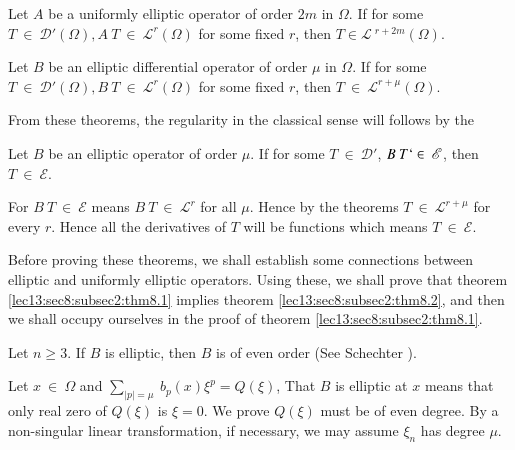 \begin{theorem} \label{lec13:sec8:subsec2:thm8.1}%
  Let $A$ be a uniformly elliptic operator of order $2m$ in $\Omega$. If
  for some $T ~ \in ~ \mathscr{D}' (\Omega), A ~ T ~
  \in~ \mathscr{L}^r(\Omega)$ for some fixed $r$, then $T
  \in \mathscr{L} ~ ^{r+2m}(\Omega)$. 
\end{theorem}

\begin{theorem}\label{lec13:sec8:subsec2:thm8.2}%
  Let $B$ be an elliptic differential operator of order $\mu$ in
  $\Omega$. If for some $T ~ \in ~ \mathscr{D}' (\Omega), B ~ T
  ~ \in ~\mathscr{L}^r (\Omega)$ for some fixed $r$, then $T ~
  \in   ~\mathscr{L}^{r+\mu} (\Omega)$. 
\end{theorem}

From these theorems, the regularity in the classical sense will follows by the 

\begin{coro*}
  Let $B$ be an elliptic operator of order $\mu$. If for some $T ~
  \in ~ \mathscr{D}'$, $B ~ T ` \in ~ \mathscr{E}$, then
  $T ~ \in ~ \mathscr{E}$. 
\end{coro*}

For $B ~ T ~ \in ~ \mathscr{E}$ means $B ~ T ~ \in ~
\mathscr{L}^r $ for all $\mu$. Hence by the theorems $T ~ \in
~ \mathscr{L}^{r+\mu}$ for every $r$. Hence all the derivatives of $T$
will be functions which means $T ~ \in ~ \mathscr{E}$. 

Before proving these theorems, we shall establish some connections
between elliptic and uniformly elliptic operators. Using these, we
shall prove that theorem \ref{lec13:sec8:subsec2:thm8.1} implies theorem \ref{lec13:sec8:subsec2:thm8.2}, and then we
shall occupy ourselves in the proof of theorem \ref{lec13:sec8:subsec2:thm8.1}. 

\begin{proposition}\label{lec13:sec8:subsec2:prop8.3}%
  Let $n \ge 3$. If $B$ is elliptic, then $B$ is of even order (See
  Schechter \cite{k15}). 
\end{proposition}

Let $x ~ \in ~ \Omega$ and $\sum\limits_{|p| = \mu} ~
b_p(x)\xi^p = Q (\xi)$, That $B$ is elliptic at $x$ means that only
real zero of $Q(\xi)$ is $\xi = 0$. We prove $Q(\xi)$ must be of even
degree. By a non-singular linear transformation, if necessary, we may
assume $\xi_n$ has degree $\mu$. 

